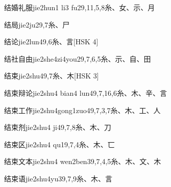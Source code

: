 \begin{entry}{结婚礼服}{jie2hun1 li3 fu2}{9,11,5,8}{⽷、⼥、⽰、⽉}
\end{entry}

\begin{entry}{结局}{jie2ju2}{9,7}{⽷、⼫}
\end{entry}

\begin{entry}{结论}{jie2lun4}{9,6}{⽷、⾔}[HSK 4]
\end{entry}

\begin{entry}{结社自由}{jie2she4zi4you2}{9,7,6,5}{⽷、⽰、⾃、⽥}
\end{entry}

\begin{entry}{结束}{jie2shu4}{9,7}{⽷、⽊}[HSK 3]
\end{entry}

\begin{entry}{结束辩论}{jie2shu4 bian4 lun4}{9,7,16,6}{⽷、⽊、⾟、⾔}
\end{entry}

\begin{entry}{结束工作}{jie2shu4gong1zuo4}{9,7,3,7}{⽷、⽊、⼯、⼈}
\end{entry}

\begin{entry}{结束剂}{jie2shu4 ji4}{9,7,8}{⽷、⽊、⼑}
\end{entry}

\begin{entry}{结束区}{jie2shu4 qu1}{9,7,4}{⽷、⽊、⼖}
\end{entry}

\begin{entry}{结束文本}{jie2shu4 wen2ben3}{9,7,4,5}{⽷、⽊、⽂、⽊}
\end{entry}

\begin{entry}{结束语}{jie2shu4yu3}{9,7,9}{⽷、⽊、⾔}
\end{entry}

